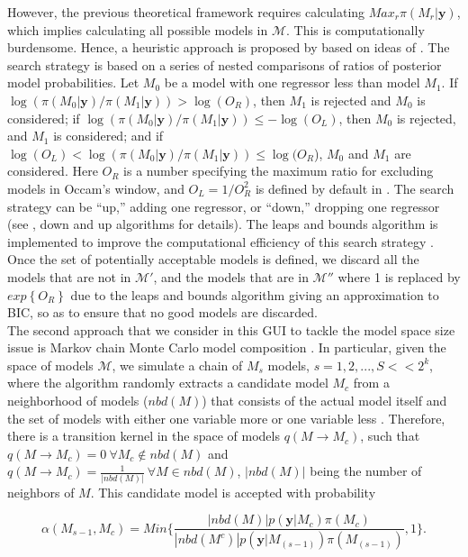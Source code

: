 However, the previous theoretical framework requires calculating $Max_r {\pi(M_r|\bm{y})}$, which implies calculating all possible models in $\mathcal{M}$.
This is computationally burdensome.
Hence, a heuristic approach is proposed by \cite{Raftery2012} based on ideas of \cite{Madigan1994}.
The search strategy is based on a series of nested comparisons of ratios of posterior model probabilities.
Let $M_0$ be a model with one regressor less than model $M_1$.
If $\log(\pi(M_0|\bm{y})/\pi(M_1|\bm{y}))>\log(O_R)$, then $M_1$ is rejected and $M_0$ is considered; if $\log(\pi(M_0|\bm{y})/\pi(M_1|\bm{y}))\leq -\log(O_L)$, then $M_0$ is rejected, and $M_1$ is considered; and if $\log(O_L)<\log(\pi(M_0|\bm{y})/\pi(M_1|\bm{y}))\leq \log(O_R$), $M_0$ and $M_1$ are considered.
Here $O_R$ is a number specifying the maximum ratio for excluding models in Occam's window, and $O_L=1/O_R^{2}$ is defined by default in \cite{Raftery2012}.
The search strategy can be ``up,'' adding one regressor, or ``down,'' dropping one regressor (see \cite{Madigan1994}, down and up algorithms for details).
The leaps and bounds algorithm \cite{Furnival1974} is implemented to improve the computational efficiency of this search strategy \cite{Raftery2012}.
Once the set of potentially acceptable models is defined, we discard all the models that are not in $\mathcal{M}'$, and the models that are in $\mathcal{M}''$ where 1 is replaced by $exp\left\{O_R\right\}$ due to the leaps and bounds algorithm giving an approximation to BIC, so as to ensure that no good models are discarded.\\

The second approach that we consider in this GUI to tackle the model space size issue is Markov chain Monte Carlo model composition \cite{madigan1995bayesian1}.
In particular, given the space of models $\mathcal{M}$, we simulate a chain of $M_{s}$ models, $s = 1, 2, ..., S<<2^k$, where the algorithm randomly extracts a candidate model $M_{c}$ from a neighborhood of models ($nbd(M)$) that consists of the actual model itself and the set of models with either one variable more or one variable less \cite{Raftery1997}.
Therefore, there is a transition kernel in the space of models $q(M\rightarrow M_{c})$, such that $q(M\rightarrow M_{c})=0 \ \forall M_{c}\notin nbd(M)$ and $q(M\rightarrow M_{c})=\frac{1}{|nbd(M)|} \ \forall M\in nbd(M)$, $|nbd(M)|$ being the number of neighbors of $M$.
This candidate model is accepted with probability

\begin{equation*} \label{eq:37}
	\alpha (M_{s-1},M_{c})=Min \bigg \{ \frac{|nbd(M)|p(\bm{y} | M_c)\pi(M_c)}{|nbd(M^{c})|p(\bm{y}| M_{(s-1)})\pi(M_{(s-1)})},1 \bigg \}.
\end{equation*}

